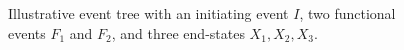 \begin{figure}[ht!]
\caption{Illustrative event tree with an initiating event \(I\), two functional events \(F_1\) and \(F_2\), and three end-states \(X_1, X_2, X_3\).}
\label{fig:event_tree_example}
\end{figure}